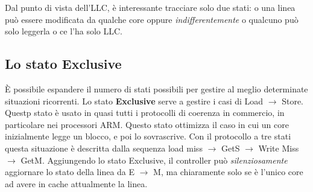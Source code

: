 \noindent Dal punto di vista dell'LLC, è interessante tracciare solo due stati: o una linea può essere modificata da qualche core oppure \textit{indifferentemente} o qualcuno può solo leggerla o ce l'ha solo LLC. 

\begin{figure}[ht]
    \centering
    \setlength{\fboxrule}{0.5pt} %
    \setlength{\fboxsep}{0pt}    %
\end{figure}

\begin{figure}[ht]
    \centering
    \setlength{\fboxrule}{0.5pt} %
    \setlength{\fboxsep}{0pt}    %
\end{figure}

\subsection{Lo stato Exclusive}
\uppercase{è} possibile espandere il numero di stati possibili per gestire al meglio determinate situazioni ricorrenti. Lo stato \textbf{Exclusive} serve a gestire i casi di Load $\rightarrow$ Store. Questp stato è usato in quasi tutti i protocolli di coerenza in commercio, in particolare nei processori ARM. Questo stato ottimizza il caso in cui un core inizialmente legge un blocco, e poi lo sovrascrive. Con il protocollo a tre stati questa situazione è descritta dalla sequenza load miss $\rightarrow$ GetS $\rightarrow$ Write Miss $\rightarrow$ GetM. Aggiungendo lo stato Exclusive, il controller può \textit{silenziosamente} aggiornare lo stato della linea da E $\rightarrow$ M, ma chiaramente solo se è l'unico core ad avere in cache attualmente la linea. 

